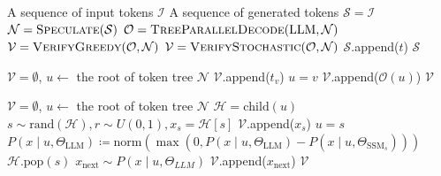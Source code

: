 \begin{algorithm}[t]
\caption{The speculation and verification algorithm used by \SpecInfer.  takes the current token sequence $\mathcal{S}$ as an input and generates a speculated token tree $\mathcal{N}$.
 generates a token $\mathcal{O}(u)$ for each node $u \in \mathcal{N}$.
 and  examine $\mathcal{N}$ against $\mathcal{O}$ and produce a sequence of verified tokens $\mathcal{V}$ using greedy or stochastic sampling, respectively.}
\label{specinfer:alg2}
\begin{algorithmic}[1]
 A sequence of input tokens $\mathcal{I}$
 A sequence of generated tokens
\State $\mathcal{S} = \mathcal{I}$
\State $\mathcal{N} = \Call{Speculate}{\mathcal{S}}$
\State $\mathcal{O} = \Call{TreeParallelDecode}{\textrm{LLM}, \mathcal{N}}$
\State $\mathcal{V} = \Call{VerifyGreedy}{\mathcal{O}, \mathcal{N}}$
\Else
\State $\mathcal{V} = \Call{VerifyStochastic}{\mathcal{O}, \mathcal{N}}$
\EndIf
{}
\State $\mathcal{S}$.append($t$)
 $\mathcal{S}$
\EndIf
\EndFor
\EndWhile
\Statex

\State $\mathcal{V} = \emptyset$, $u \leftarrow$ the root of token tree $\mathcal{N}$
\State $\mathcal{V}$.append($t_v$)
\State $u = v$
\EndWhile
\State $\mathcal{V}$.append($\mathcal{O}(u)$)
 $\mathcal{V}$
\EndFunction
\Statex

\State $\mathcal{V} = \emptyset$, $u \leftarrow$ the root of token tree $\mathcal{N}$
\State $\mathcal{H} = \textrm{child}(u)$
    \State $s\sim \textrm{rand}(\mathcal{H}), r \sim U(0, 1), x_s=\mathcal{H}[s]$
            \State $\mathcal{V}$.append($x_s$)
            \State $u = s$
        \Else
            \State $P(x \mid u, \Theta_{\textrm{LLM}})\coloneqq \textrm{norm}(\max(0, P(x \mid u, \Theta_{\textrm{LLM}})-P(x \mid u, \Theta_{\textrm{SSM}_s})))$
            \State $\mathcal{H}.\textrm{pop}(s)$
        \EndIf
    \EndWhile
{}
\EndIf
\EndWhile
{}
\State $x_{\textrm{next}} \sim P(x \mid u, \Theta_{LLM})$
\State $\mathcal{V}$.append($x_{\textrm{next}}$)
 $\mathcal{V}$
\EndFunction
\end{algorithmic}
\end{algorithm}


